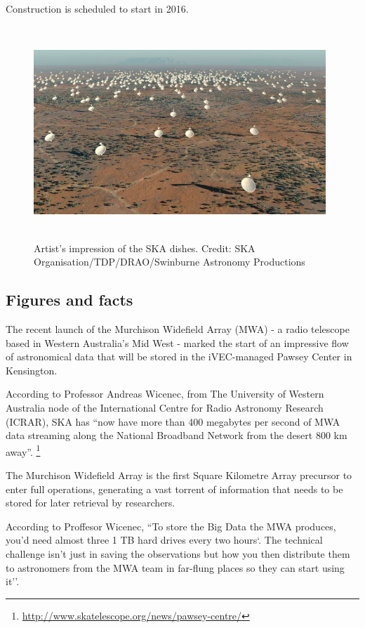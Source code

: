 Construction is scheduled to start in 2016.

\begin{figure}[H]
\centering
\includegraphics[width=11cm,height=8cm]{images/ska.jpg}
\caption{Artist's impression of the SKA dishes. Credit: SKA Organisation/TDP/DRAO/Swinburne Astronomy Productions}
\end{figure}

\subsection{Figures and facts}

The recent launch of the Murchison Widefield Array (MWA) - a radio telescope based in Western Australia's Mid West - marked the start of an impressive flow of astronomical data that will be stored in the iVEC-managed Pawsey Center in Kensington. \newline

According to Professor Andreas Wicenec, from The University of Western Australia node of the International Centre for Radio Astronomy Research (ICRAR), SKA has ``now have more than 400 megabytes per second of MWA data streaming along the National Broadband Network from the desert 800 km away''. \footnote{\url{http://www.skatelescope.org/news/pawsey-centre/}}  \newline

The Murchison Widefield Array is the first Square Kilometre Array precursor to enter full operations, generating a vast torrent of information that needs to be stored for later retrieval by researchers. \newline

According to Proffesor Wicenec, ``To store the Big Data the MWA produces, you’d need almost three 1 TB hard drives every two hours`. The technical challenge isn’t just in saving the observations but how you then distribute them to astronomers from the MWA team in far-flung places so they can start using it''.

